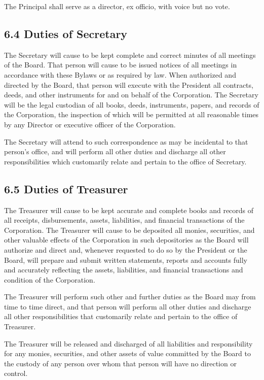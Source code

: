 \documentclass[
]{book}
\begin{document}
The Principal shall serve as a director, ex officio, with voice but no vote.

\subsection{6.4 Duties of Secretary}\label{duties-of-secretary}

The Secretary will cause to be kept complete and correct minutes of all meetings of the Board. That person will cause to be issued notices of all meetings in accordance with these Bylaws or as required by law. When authorized and directed by the Board, that person will execute with the President all contracts, deeds, and other instruments for and on behalf of the Corporation. The Secretary will be the legal custodian of all books, deeds, instruments, papers, and records of the Corporation, the inspection of which will be permitted at all reasonable times by any Director or executive officer of the Corporation.

The Secretary will attend to such correspondence as may be incidental to that person's office, and will perform all other duties and discharge all other responsibilities which customarily relate and pertain to the office of Secretary.

\subsection{6.5 Duties of Treasurer}\label{duties-of-treasurer}

The Treasurer will cause to be kept accurate and complete books and records of all receipts, disbursements, assets, liabilities, and financial transactions of the Corporation. The Treasurer will cause to be deposited all monies, securities, and other valuable effects of the Corporation in such depositories as the Board will authorize and direct and, whenever requested to do so by the President or the Board, will prepare and submit written statements, reports and accounts fully and accurately reflecting the assets, liabilities, and financial transactions and condition of the Corporation.

The Treasurer will perform such other and further duties as the Board may from time to time direct, and that person will perform all other duties and discharge all other responsibilities that customarily relate and pertain to the office of Treasurer.

The Treasurer will be released and discharged of all liabilities and responsibility for any monies, securities, and other assets of value committed by the Board to the custody of any person over whom that person will have no direction or control.
\end{document}
